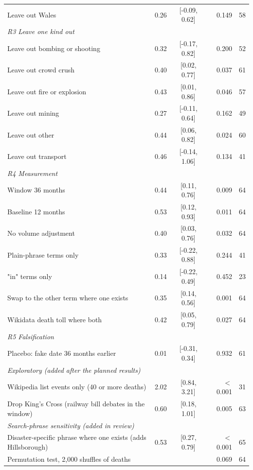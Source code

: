 \documentclass[11pt,a4paper]{article}
\begin{document}
\begin{longtable}{p{8.6cm}rcrr}
\quad Leave out Wales & 0.26 & [-0.09, 0.62] & 0.149 & 58\\
\multicolumn{5}{l}{\textit{R3 Leave one kind out}}\\
\quad Leave out bombing or shooting & 0.32 & [-0.17, 0.82] & 0.200 & 52\\
\quad Leave out crowd crush & 0.40 & [0.02, 0.77] & 0.037 & 61\\
\quad Leave out fire or explosion & 0.43 & [0.01, 0.86] & 0.046 & 57\\
\quad Leave out mining & 0.27 & [-0.11, 0.64] & 0.162 & 49\\
\quad Leave out other & 0.44 & [0.06, 0.82] & 0.024 & 60\\
\quad Leave out transport & 0.46 & [-0.14, 1.06] & 0.134 & 41\\
\multicolumn{5}{l}{\textit{R4 Measurement}}\\
\quad Window 36 months & 0.44 & [0.11, 0.76] & 0.009 & 64\\
\quad Baseline 12 months & 0.53 & [0.12, 0.93] & 0.011 & 64\\
\quad No volume adjustment & 0.40 & [0.03, 0.76] & 0.032 & 64\\
\quad Plain-phrase terms only & 0.33 & [-0.22, 0.88] & 0.244 & 41\\
\quad "in" terms only & 0.14 & [-0.22, 0.49] & 0.452 & 23\\
\quad Swap to the other term where one exists & 0.35 & [0.14, 0.56] & 0.001 & 64\\
\quad Wikidata death toll where both & 0.42 & [0.05, 0.79] & 0.027 & 64\\
\multicolumn{5}{l}{\textit{R5 Falsification}}\\
\quad Placebo: fake date 36 months earlier & 0.01 & [-0.31, 0.34] & 0.932 & 61\\
\multicolumn{5}{l}{\textit{Exploratory (added after the planned results)}}\\
\quad Wikipedia list events only (40 or more deaths) & 2.02 & [0.84, 3.21] & $<$0.001 & 31\\
\quad Drop King's Cross (railway bill debates in the window) & 0.60 & [0.18, 1.01] & 0.005 & 63\\
\multicolumn{5}{l}{\textit{Search-phrase sensitivity (added in review)}}\\
\quad Disaster-specific phrase where one exists (adds Hillsborough) & 0.53 & [0.27, 0.79] & $<$0.001 & 65\\
\quad Permutation test, 2,000 shuffles of deaths & & & 0.069 & 64\\
\end{longtable}
\end{document}
